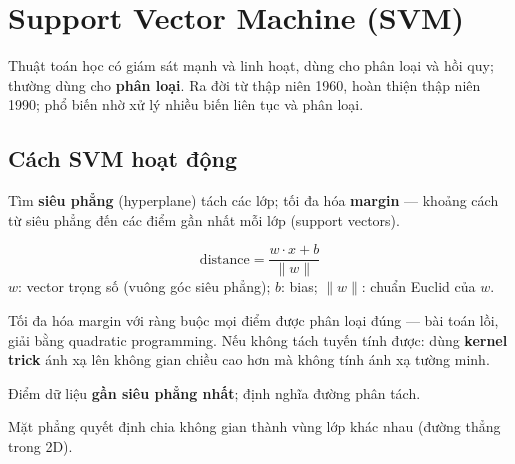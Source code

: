 \section{Support Vector Machine (SVM)}
\label{sec:svm}

\begin{dinhnghia}[title={Support Vector Machine (SVM)}]
Thuật toán học có giám sát mạnh và linh hoạt, dùng cho phân loại và hồi quy; thường dùng cho \textbf{phân loại}.
Ra đời từ thập niên 1960, hoàn thiện thập niên 1990; phổ biến nhờ xử lý nhiều biến liên tục và phân loại.
\end{dinhnghia}

\subsection{Cách SVM hoạt động}

\begin{dongco}[title={target}]
Tìm \textbf{siêu phẳng} (hyperplane) tách các lớp; tối đa hóa \textbf{margin} --- khoảng cách từ siêu phẳng đến các điểm gần nhất mỗi lớp (support vectors).
\end{dongco}

\begin{phuongphap}[title={Khoảng cách đến siêu phẳng}]
\[
\mathrm{distance} = \frac{w \cdot x + b}{\|w\|}
\]
$w$: vector trọng số (vuông góc siêu phẳng); $b$: bias; $\|w\|$: chuẩn Euclid của $w$.
\end{phuongphap}

\begin{phuongphap}[title={Bài toán tối ưu}]
Tối đa hóa margin với ràng buộc mọi điểm được phân loại đúng --- bài toán lồi, giải bằng quadratic programming.
Nếu không tách tuyến tính được: dùng \textbf{kernel trick} ánh xạ lên không gian chiều cao hơn mà không tính ánh xạ tường minh.
\end{phuongphap}


\begin{dinhnghia}[title={Support Vectors}]
Điểm dữ liệu \textbf{gần siêu phẳng nhất}; định nghĩa đường phân tách.
\end{dinhnghia}

\begin{dinhnghia}[title={Hyperplane}]
Mặt phẳng quyết định chia không gian thành vùng lớp khác nhau (đường thẳng trong 2D).
\end{dinhnghia}

